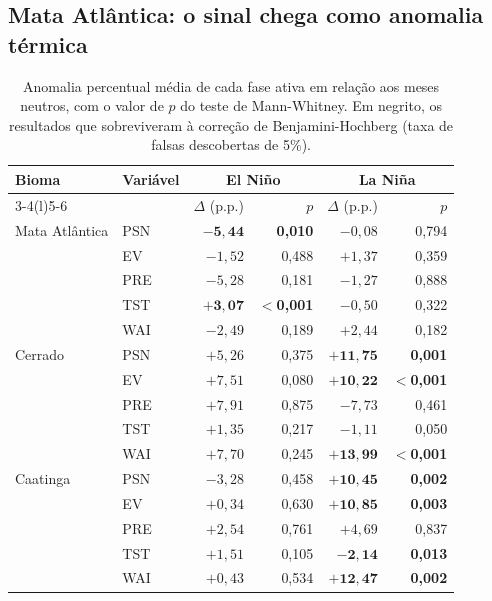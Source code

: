 \documentclass[a4paper,fleqn]{cas-sc}
\begin{document}
\subsection{Mata Atlântica: o sinal chega como anomalia térmica}

\begin{table}[width=\textwidth,cols=7,pos=t]
\caption{Anomalia percentual média de cada fase ativa em relação aos meses neutros, com o valor de $p$ do teste de Mann-Whitney. Em negrito, os resultados que sobreviveram à correção de Benjamini-Hochberg (taxa de falsas descobertas de 5\%).}
\label{tab:convencional}
\begin{tabular*}{\tblwidth}{@{}llrrrr@{}}
\toprule
Bioma & Variável & \multicolumn{2}{c}{El Niño} & \multicolumn{2}{c}{La Niña} \\
\cmidrule(lr){3-4}\cmidrule(l){5-6}
 & & $\Delta$ (p.p.) & $p$ & $\Delta$ (p.p.) & $p$ \\
\midrule
Mata Atlântica & PSN & $\mathbf{-5{,}44}$ & \textbf{0,010} & $-0{,}08$ & 0,794 \\
               & EV  & $-1{,}52$ & 0,488 & $+1{,}37$ & 0,359 \\
               & PRE & $-5{,}28$ & 0,181 & $-1{,}27$ & 0,888 \\
               & TST & $\mathbf{+3{,}07}$ & \textbf{$<$0,001} & $-0{,}50$ & 0,322 \\
               & WAI & $-2{,}49$ & 0,189 & $+2{,}44$ & 0,182 \\
\addlinespace
Cerrado        & PSN & $+5{,}26$ & 0,375 & $\mathbf{+11{,}75}$ & \textbf{0,001} \\
               & EV  & $+7{,}51$ & 0,080 & $\mathbf{+10{,}22}$ & \textbf{$<$0,001} \\
               & PRE & $+7{,}91$ & 0,875 & $-7{,}73$ & 0,461 \\
               & TST & $+1{,}35$ & 0,217 & $-1{,}11$ & 0,050 \\
               & WAI & $+7{,}70$ & 0,245 & $\mathbf{+13{,}99}$ & \textbf{$<$0,001} \\
\addlinespace
Caatinga       & PSN & $-3{,}28$ & 0,458 & $\mathbf{+10{,}45}$ & \textbf{0,002} \\
               & EV  & $+0{,}34$ & 0,630 & $\mathbf{+10{,}85}$ & \textbf{0,003} \\
               & PRE & $+2{,}54$ & 0,761 & $+4{,}69$ & 0,837 \\
               & TST & $+1{,}51$ & 0,105 & $\mathbf{-2{,}14}$ & \textbf{0,013} \\
               & WAI & $+0{,}43$ & 0,534 & $\mathbf{+12{,}47}$ & \textbf{0,002} \\
\bottomrule
\end{tabular*}
\end{table}
\end{document}
